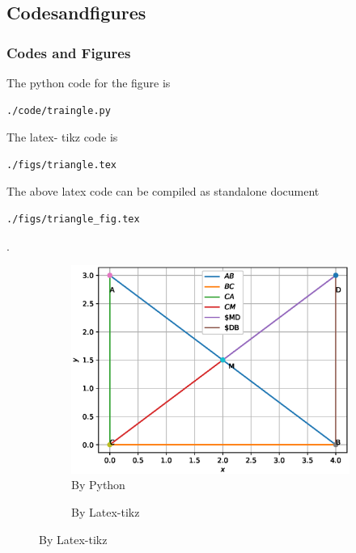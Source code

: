 \documentclass{beamer}
\theoremstyle{remark}
\numberwithin{equation}{section}
\begin{document}
\subsection*{Codesandfigures}
\begin{frame}[fragile,shrink=1]
\frametitle{Codes and Figures}
\footnotesize
\begin{flushleft}
The python code for the figure is
\begin{lstlisting}
./code/traingle.py
\end{lstlisting}
The latex- tikz code is
\begin{lstlisting}
./figs/triangle.tex
\end{lstlisting}
The above latex code can be compiled as standalone document
\begin{lstlisting} 
./figs/triangle_fig.tex
\end{lstlisting}
\end{flushleft}.
\begin{figure}
\begin{flushleft}
\begin{subfigure}{0.2\textwidth}
\includegraphics[scale=0.275]{./figs/triangle.eps}
\caption{\tiny By Python}
\end{subfigure}
%
\begin{subfigure}{0.65\textwidth}
\begin{flushright}

\caption{\tiny By Latex-tikz}
\end{flushright}
\end{subfigure}
\end{flushleft}
%
\end{figure}
\end{frame}
\end{document}

